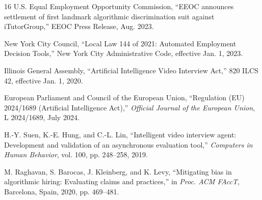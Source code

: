 \documentclass[conference]{IEEEtran}
\begin{document}
\begin{thebibliography}{16}
U.S. Equal Employment Opportunity Commission,
``EEOC announces settlement of first landmark algorithmic discrimination suit against iTutorGroup,''
EEOC Press Release,
Aug. 2023.

New York City Council,
``Local Law 144 of 2021: Automated Employment Decision Tools,''
New York City Administrative Code,
effective Jan. 1, 2023.

Illinois General Assembly,
``Artificial Intelligence Video Interview Act,''
820 ILCS 42,
effective Jan. 1, 2020.

European Parliament and Council of the European Union,
``Regulation (EU) 2024/1689 (Artificial Intelligence Act),''
\textit{Official Journal of the European Union},
L 2024/1689, July 2024.

H.-Y. Suen, K.-E. Hung, and C.-L. Lin,
``Intelligent video interview agent: Development and validation of an asynchronous evaluation tool,''
\textit{Computers in Human Behavior},
vol. 100, pp. 248--258, 2019.

M. Raghavan, S. Barocas, J. Kleinberg, and K. Levy,
``Mitigating bias in algorithmic hiring: Evaluating claims and practices,''
in \textit{Proc. ACM FAccT},
Barcelona, Spain, 2020, pp. 469--481.

\end{thebibliography}
\end{document}
